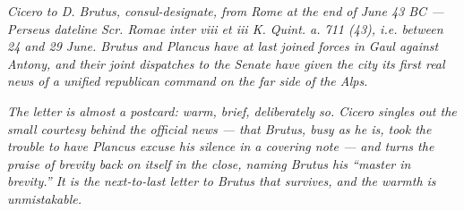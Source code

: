 
\textit{Cicero to D. Brutus, consul-designate, from Rome at
the end of June 43 BC --- Perseus dateline \textit{Scr. Romae
inter viii et iii K. Quint. a. 711 (43)}, i.e. between 24 and
29 June. Brutus and Plancus have at last joined forces in
Gaul against Antony, and their joint dispatches to the
Senate have given the city its first real news of a unified
republican command on the far side of the Alps.}

\textit{The letter is almost a postcard: warm, brief,
deliberately so. Cicero singles out the small courtesy
behind the official news --- that Brutus, busy as he is,
took the trouble to have Plancus excuse his silence in a
covering note --- and turns the praise of brevity back on
itself in the close, naming Brutus his ``master in
brevity.'' It is the next-to-last letter to Brutus that
survives, and the warmth is unmistakable.}
